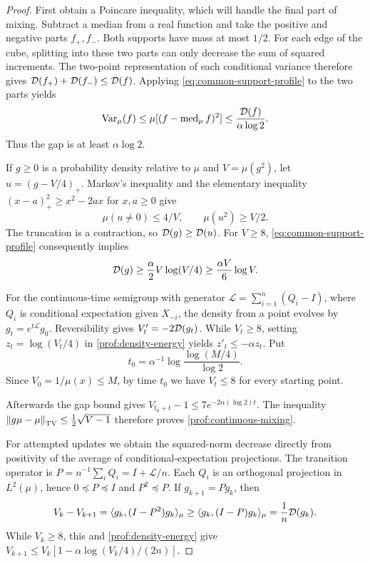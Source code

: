 \begin{proof}
First obtain a Poincare inequality, which will handle the final part
of mixing. Subtract a median from a real function and take the positive
and negative parts $f_+,f_-$. Both supports have mass at most $1/2$.
For each edge of the cube, splitting into these two parts can only
decrease the sum of squared increments. The two-point representation
of each conditional variance therefore gives
$\mathcal D(f_+)+\mathcal D(f_-)\le\mathcal D(f)$. Applying
\eqref{eq:common-support-profile} to the two parts yields
\[
 \operatorname{Var}_\mu(f)\le\mu[(f-\operatorname{med}_\mu f)^2]
 \le\frac{\mathcal D(f)}{\alpha\log2}.
\]
Thus the gap is at least $\alpha\log2$.

If $g\ge0$ is a probability density relative to $\mu$ and $V=\mu(g^2)$,
let $u=(g-V/4)_+$. Markov's inequality and the elementary inequality
$(x-a)_+^2\ge x^2-2ax$ for $x,a\ge0$ give
\[
 \mu(u\ne0)\le4/V,\qquad \mu(u^2)\ge V/2.
\]
The truncation is a contraction, so $\mathcal D(g)\ge\mathcal D(u)$.
For $V\ge8$, \eqref{eq:common-support-profile} consequently implies
\begin{equation}
 \mathcal D(g)\ge\frac\alpha2 V\log(V/4)
       \ge\frac{\alpha V}{6}\log V.
 \label{prof:density-energy}
\end{equation}

For the continuous-time semigroup with generator
$\mathcal L=\sum_{i=1}^n(Q_i-I)$, where $Q_i$ is conditional expectation given
$X_{-i}$, the density from a point evolves by $g_t=e^{t\mathcal L}g_0$.
Reversibility gives $V'_t=-2\mathcal D(g_t)$. While $V_t\ge8$, setting
$z_t=\log(V_t/4)$ in \eqref{prof:density-energy} yields
$z'_t\le-\alpha z_t$. Put
\[
 t_0=\alpha^{-1}\log\frac{\log(M/4)}{\log2}.
\]
Since $V_0=1/\mu(x)\le M$, by time $t_0$ we have $V_t\le8$ for every
starting point.

Afterwards the gap bound gives
$V_{t_0+t}-1\le7e^{-2\alpha(\log2)t}$.
The inequality $\left\lVert g\mu-\mu\right\rVert_{\mathrm{TV}}\le\tfrac12\sqrt{V-1}$
therefore proves \eqref{prof:continuous-mixing}.

For attempted updates we obtain the squared-norm decrease directly
from positivity of the average of conditional-expectation projections.
The transition operator is $P=n^{-1}\sum_iQ_i=I+\mathcal L/n$.
Each $Q_i$ is an orthogonal projection in $L^2(\mu)$, hence
$0\preceq P\preceq I$ and $P^2\preceq P$.
If $g_{k+1}=Pg_k$, then
\[
 V_k-V_{k+1}
 =\langle g_k,(I-P^2)g_k\rangle_\mu
 \ge\langle g_k,(I-P)g_k\rangle_\mu
 =\frac1n\mathcal D(g_k).
\]
While $V_k\ge8$, this and \eqref{prof:density-energy} give
$V_{k+1}\le V_k[1-\alpha\log(V_k/4)/(2n)]$.


\end{proof}
